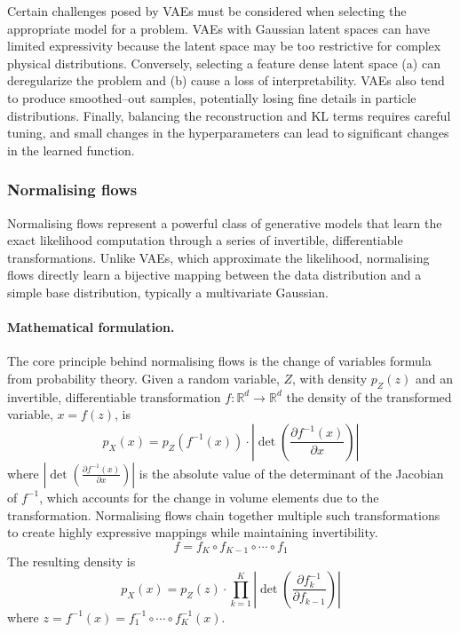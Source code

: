         Certain challenges posed by VAEs must be considered when selecting the appropriate model for a problem.
        VAEs with Gaussian latent spaces can have limited expressivity because the latent space may be too restrictive for complex physical distributions.
        Conversely, selecting a feature dense latent space (a) can deregularize the problem and (b) cause a loss of interpretability.
        VAEs also tend to produce smoothed--out samples, potentially losing fine details in particle distributions.
        Finally, balancing the reconstruction and KL terms requires careful tuning, and small changes in the hyperparameters can lead to significant changes in the learned function.

    \subsubsection{Normalising flows}
        Normalising flows represent a powerful class of generative models that learn the exact likelihood computation through a series of invertible, differentiable transformations.
        Unlike VAEs, which approximate the likelihood, normalising flows directly learn a bijective mapping between the data distribution and a simple base distribution, typically a multivariate Gaussian.

        \paragraph{Mathematical formulation.}
            The core principle behind normalising flows is the change of variables formula from probability theory.
            Given a random variable, \(Z\), with density \(p_Z(z)\) and an invertible, differentiable transformation \(f:\mathbb{R}^d \rightarrow \mathbb{R}^d\) the density of the transformed variable, \(x = f(z)\), is
            \begin{equation}
                p_X(x) = p_Z(f^{-1}(x)) \cdot \left|\det\left(\frac{\partial f^{-1}(x)}{\partial x}\right)\right|
            \end{equation}
            where \(\left|\det\left(\frac{\partial f^{-1}(x)}{\partial x}\right)\right|\) is the absolute value of the determinant of the Jacobian of \(f^{-1}\), which accounts for the change in volume elements due to the transformation.
            Normalising flows chain together multiple such transformations to create highly expressive mappings while maintaining invertibility.
            \begin{equation}
                f = f_K \circ f_{K-1} \circ \cdots \circ f_1
            \end{equation}
            The resulting density is
            \begin{equation}
                p_X(x) = p_Z(z) \cdot \prod_{k=1}^{K} \left|\det\left(\frac{\partial f_k^{-1}}{\partial f_{k-1}}\right)\right|
            \end{equation}
            where \(z = f^{-1}(x) = f_1^{-1} \circ \cdots \circ f_K^{-1}(x)\).

